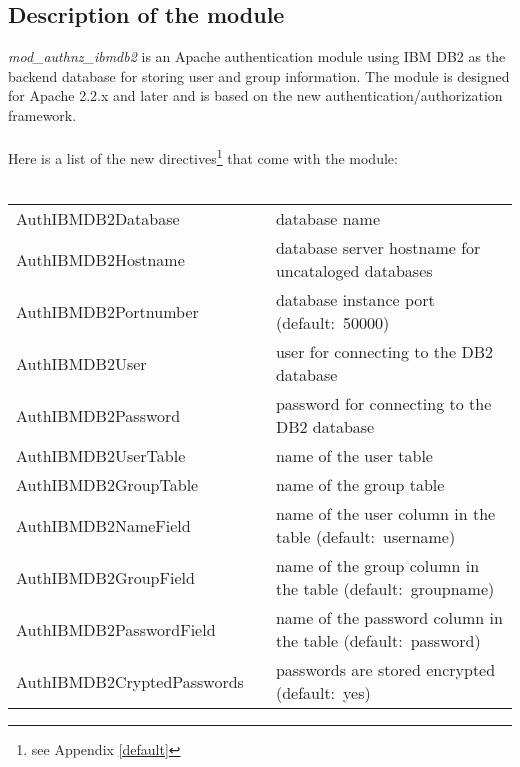 \documentclass[11pt,letterpaper]{scrartcl}
\def\tt{\normalfont\ttfamily}
\begin{document}
\subsection{Description of the module}
\emph{mod\_authnz\_ibmdb2} is an Apache authentication module using IBM DB2 as the backend database for storing user and group information. The module is designed for Apache 2.2.x and later and is based on the new authentication/authorization framework.\\
\\
Here is a list of the new directives\footnote{see Appendix \ref{default}} that come with the module:\\
\\
\small
\begin{tabular}{@{} ll >{\raggedright\arraybackslash}p{ 50ex } @{}}
{\tt AuthIBMDB2Database} & & database name \\

{\tt AuthIBMDB2Hostname} & & database server hostname for uncataloged databases \\

{\tt AuthIBMDB2Portnumber} & & database instance port \mbox{(default: 50000)} \\

{\tt AuthIBMDB2User} & & user for connecting to the DB2 database \\

{\tt AuthIBMDB2Password} & & password for connecting to the DB2 database \\

{\tt AuthIBMDB2UserTable} & & name of the user table \\

{\tt AuthIBMDB2GroupTable} & & name of the group table \\

{\tt AuthIBMDB2NameField} & & name of the user column in the table \mbox{(default: {\tt username})} \\

{\tt AuthIBMDB2GroupField} & & name of the group column in the table \mbox{(default: {\tt groupname})} \\

{\tt AuthIBMDB2PasswordField} & & name of the password column in the table \mbox{(default: {\tt password})} \\

{\tt AuthIBMDB2CryptedPasswords} & & passwords are stored encrypted \mbox{(default: {\tt yes})} \\


\end{tabular}
\end{document}
